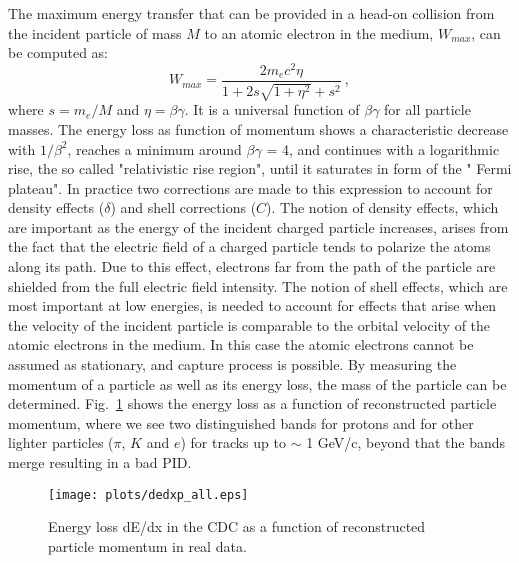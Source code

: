 The maximum energy transfer that can be provided in a head-on collision from the incident particle of mass $M$ to an atomic electron in the medium, $W_{max}$, can be computed as:
\begin{equation}
    \label{eq.3.2}
    W_{max} = \frac{2 m_e c^2 \eta}{1 + 2 s \sqrt{1 + \eta^2} + s^2}~,
\end{equation}
where $s = m_e/M$ and $\eta = \beta \gamma$.
It is a universal function of $\beta \gamma$ for all particle masses. The energy loss as function of momentum shows a characteristic decrease with $1/\beta^{2}$, reaches a minimum around $\beta \gamma$ = 4, and continues with a logarithmic rise, the so called "relativistic rise region", until it saturates in form of the " Fermi plateau". In practice two corrections are made to this expression to account for density effects ($\delta$) and shell corrections ($C$). The notion of density effects, which are important as the energy of the incident charged particle increases, arises from the fact that the electric field of a charged particle tends to polarize the atoms along its path. Due to this effect, electrons far from the path of the particle are shielded from the full electric field intensity. The notion of shell effects, which are most important at low energies, is needed to account for effects that arise when the velocity of the incident particle is comparable to the orbital velocity of the atomic electrons in the medium. In this case the atomic electrons cannot be assumed as stationary, and capture process is possible. By measuring the momentum of a particle as well as its energy loss, the mass of the particle can be determined. Fig.~\ref{fig.3.1} shows the energy loss as a function of reconstructed particle momentum, where we see two distinguished bands for protons and for other lighter particles ($\pi$, $K$ and $e$) for tracks up to $\sim$ 1 GeV/c, beyond that the bands merge resulting in a bad PID.
\begin{figure}[H]
    \centering
    \texttt{[image: plots/dedxp\_all.eps]}
    \caption{\label{fig.3.1}Energy loss dE/dx in the CDC as a function of reconstructed particle momentum in real data.}
\end{figure}

